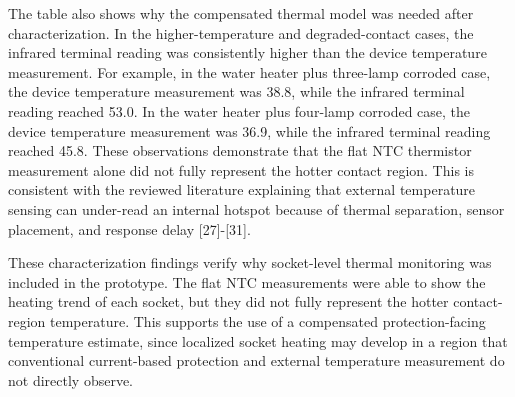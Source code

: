 The table also shows why the compensated thermal model was needed after
characterization. In the higher-temperature and degraded-contact cases, the
infrared terminal reading was consistently higher than the device temperature
measurement. For example, in the water heater plus three-lamp corroded case, the
device temperature measurement was 38.8{\degreeC}, while the infrared terminal
reading reached 53.0{\degreeC}. In the water heater plus four-lamp corroded
case, the device temperature measurement was 36.9{\degreeC}, while the infrared
terminal reading reached 45.8{\degreeC}. These observations demonstrate that
the flat NTC thermistor measurement alone did not fully represent the hotter
contact region. This is consistent with the reviewed literature explaining that
external temperature sensing can under-read an internal hotspot because of
thermal separation, sensor placement, and response delay [27]-[31].

These characterization findings verify why socket-level thermal monitoring was included in the
prototype. The flat NTC measurements were able to show the heating trend of each
socket, but they did not fully represent the hotter contact-region temperature.
This supports the use of a compensated protection-facing temperature estimate,
since localized socket heating may develop in a region that conventional
current-based protection and external temperature measurement do not directly
observe.